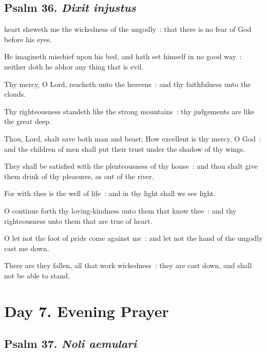 \subsection{Psalm 36. \textit{Dixit injustus}}

 heart sheweth me the wickedness of the ungodly~: that there is no fear of God before his eyes.\par
{}
He imagineth mischief upon his bed, and hath set himself in no good way~: neither doth he abhor any thing that is evil.\par
{}Thy mercy, O Lord, reacheth unto the heavens~: and thy faithfulness unto the clouds.\par
{}Thy righteousness standeth like the strong mountains~: thy judgements are like the great deep.\par
{}Thou, Lord, shalt save both man and beast; How excellent is thy mercy, O God~: and the children of men shall put their trust under the shadow of thy wings.\par
{}They shall be satisfied with the plenteousness of thy house~: and thou shalt give them drink of thy pleasures, as out of the river.\par
{}For with thee is the well of life~: and in thy light shall we see light.\par
{}O continue forth thy loving-kindness unto them that know thee~: and thy righteousness unto them that are true of heart.\par
{}O let not the foot of pride come against me~: and let not the hand of the ungodly cast me down.\par
{}There are they fallen, all that work wickedness~: they are cast down, and shall not be able to stand.\par


\clearpage
\section*{Day 7. Evening Prayer}

\subsection{Psalm 37. \textit{Noli aemulari}}

